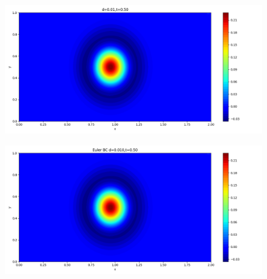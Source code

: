 \documentclass[12pt]{article}
\begin{document}
\begin{figure}[H]
\begin{minipage}{\linewidth}
\begin{minipage}{0.5\textwidth}
\includegraphics[width=\linewidth]{figures/3d0.01t0.50.png}
\label{fig3}
\end{minipage}\hfill
\begin{minipage}{0.5\textwidth}
\includegraphics[width=\linewidth]{figures/3Ed0.010t0.50.png}
\label{fig4}
\end{minipage}
\vspace{-1.5em}


\end{minipage}
\end{figure}
\end{document}
